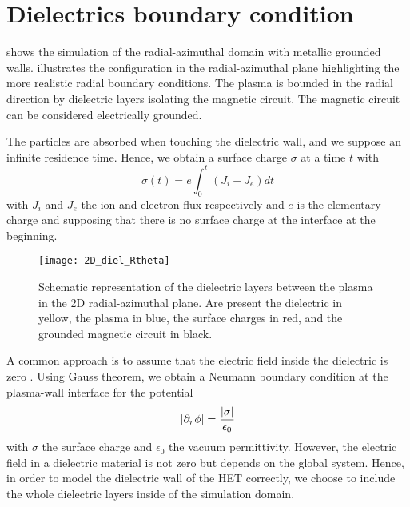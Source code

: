 
\section{Dielectrics boundary condition}
  \label{sec-diel}

   shows the simulation of the radial-azimuthal domain with metallic grounded walls.
   illustrates the configuration in the radial-azimuthal plane highlighting the more realistic radial boundary conditions.
  The plasma is bounded in the radial direction by dielectric layers isolating the magnetic circuit.
  The magnetic circuit can be considered electrically grounded.

  The particles are absorbed when touching the dielectric wall, and we suppose an infinite residence time.
  Hence, we obtain a surface charge $\sigma$ at a time $t$ with
  \begin{equation} \label{eq-sigmaintegrate}
    \sigma(t) = e \int_0^t (J_i - J_e) dt
  \end{equation}
  with $J_i$ and $J_e$ the ion and electron flux respectively and $e$ is the elementary charge and supposing that there is no surface charge at the interface at the beginning.

  \begin{figure}[hbtp]
    \centering
    \texttt{[image: 2D\_diel\_Rtheta]}
    \caption{Schematic representation of the dielectric layers between the plasma in the \ac{2D} radial-azimuthal plane. Are present the dielectric in yellow, the plasma in blue, the surface charges in red, and the grounded magnetic circuit in black.}
    \label{fig-2D}
  \end{figure}


  A common approach is to assume that the electric field inside the dielectric is zero \citep{taccogna2019}. 
  Using Gauss theorem, we obtain a Neumann boundary condition at the plasma-wall interface for the potential
  \begin{equation} \label{eq-gauss}
    \lvert\partial_r \phi\rvert = \frac{\lvert\sigma\rvert}{\epsilon_0}
  \end{equation}
  with $\sigma$ the surface charge and $\epsilon_0$ the vacuum permittivity.
  However, the electric field in a dielectric material is not zero but depends on the global system.
  Hence, in order to model the dielectric wall of the \ac{HET} correctly, we choose to include the whole dielectric layers inside of the simulation domain.

